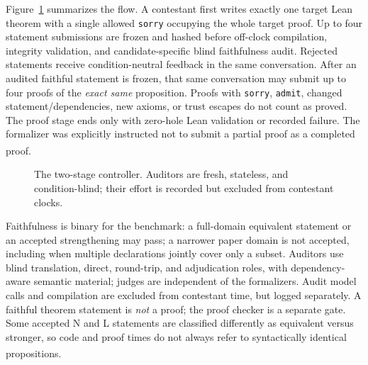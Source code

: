 \documentclass[10pt,a4paper]{article}
\newcommand{\src}[1]{\textsuperscript{\cite{#1}}}
\begin{document}
Figure~\ref{fig:flow} summarizes the flow. A contestant first writes exactly
one target Lean theorem with a single allowed \texttt{sorry} occupying the
whole target proof. Up to four statement submissions are frozen and hashed
before off-clock compilation, integrity validation, and candidate-specific
blind faithfulness audit. Rejected statements receive condition-neutral
feedback in the same conversation. After an audited faithful statement is
frozen, that same conversation may submit up to four proofs of the \emph{exact
same} proposition. Proofs with \texttt{sorry}, \texttt{admit}, changed
statement/dependencies, new axioms, or trust escapes do not count as proved.
The proof stage ends only with zero-hole Lean validation or recorded failure.
The formalizer was explicitly instructed not to submit a partial proof as a
completed proof.\src{protocol27,commonprompt,proofprompt,metrics33}

\begin{figure}[ht]
\centering\small
{}
\caption{The two-stage controller. Auditors are fresh, stateless, and condition-blind; their effort is recorded but excluded from contestant clocks.\cite{protocol27,metrics33,recovery35}}
\label{fig:flow}
\end{figure}

Faithfulness is binary for the benchmark: a full-domain equivalent statement
or an accepted strengthening may pass; a narrower paper domain is not
accepted, including when multiple declarations jointly cover only a subset.
Auditors use blind translation, direct, round-trip, and adjudication roles,
with dependency-aware semantic material; judges are independent of the
formalizers. Audit model calls and compilation are excluded from contestant
time, but logged separately. A faithful theorem statement is \emph{not} a
proof; the proof checker is a separate gate. Some accepted N and L
statements are classified differently as equivalent versus stronger, so code
and proof times do not always refer to syntactically identical propositions.
\src{protocol27,metrics33,results35,auditprompts}
\end{document}
